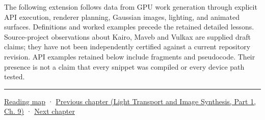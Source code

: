 The following extension follows data from GPU work generation through explicit API execution, renderer planning, Gaussian images, lighting, and animated surfaces. Definitions and worked examples precede the retained detailed lessons. Source-project observations about Kairo, Maveb and Vulkax are supplied draft claims; they have not been independently certified against a current repository revision. API examples retained below include fragments and pseudocode. Their presence is not a claim that every snippet was compiled or every device path tested.

\begin{center}\rule{0.5\linewidth}{0.5pt}\end{center}

\hyperref[volume-reading-map]{Reading map} · \href{../04-Light-Transport-and-Image-Synthesis-P01/main.pdf\#04-visual-computing-ii-ch035-a-complete-renderer-as-an-executable-forward-model}{Previous chapter (Light Transport and Image Synthesis, Part 1, Ch. 9)} · \hyperref[04-visual-computing-ii-ch037-gaussian-splatting-and-editable-captured-worlds]{Next chapter}
